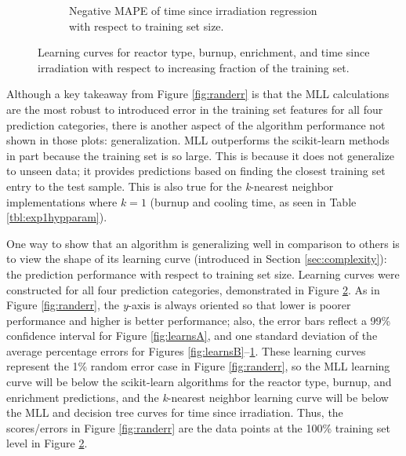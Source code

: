 \begin{figure}[!htb]
\begin{subfigure}[b]{0.49\textwidth}
        \caption{Negative \gls{MAPE} of time since irradiation regression with 
                 respect to training set size.}
        \label{fig:learnsD}
    \end{subfigure}
    \caption{Learning curves for reactor type, burnup, enrichment, and time 
             since irradiation with respect to increasing fraction of the 
             training set.}
    \label{fig:learns}
\end{figure}

Although a key takeaway from Figure \ref{fig:randerr} is that the \gls{MLL}
calculations are the most robust to introduced error in the training set
features for all four prediction categories, there is another aspect of the
algorithm performance not shown in those plots: generalization. \Gls{MLL}
outperforms the scikit-learn methods in part because the training set is so
large. This is because it does not generalize to unseen data; it provides
predictions based on finding the closest training set entry to the test sample.
This is also true for the \textit{k}-nearest neighbor implementations where
$k=1$ (burnup and cooling time, as seen in Table \ref{tbl:exp1hypparam}).

One way to show that an algorithm is generalizing well in comparison to others
is to view the shape of its learning curve (introduced in Section
\ref{sec:complexity}): the prediction performance with respect to training set
size.  Learning curves were constructed for all four prediction categories,
demonstrated in Figure \ref{fig:learns}. As in Figure \ref{fig:randerr}, the
\textit{y}-axis is always oriented so that lower is poorer performance and
higher is better performance; also, the error bars reflect a 99\% confidence
interval for Figure \ref{fig:learnsA}, and one standard deviation of the
average percentage errors for Figures \ref{fig:learnsB}--\ref{fig:learnsD}.
These learning curves represent the 1\% random error case in Figure
\ref{fig:randerr}, so the \gls{MLL} learning curve will be below the
scikit-learn algorithms for the reactor type, burnup, and enrichment
predictions, and the \textit{k}-nearest neighbor learning curve will be below
the \gls{MLL} and decision tree curves for time since irradiation. Thus, the
scores/errors in Figure \ref{fig:randerr} are the data points at the 100\%
training set level in Figure \ref{fig:learns}.


